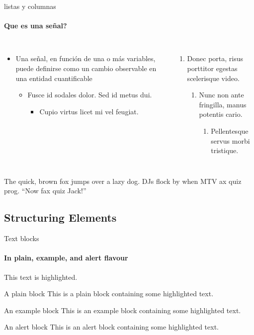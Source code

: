 \begin{darkframes}
    \begin{frame}[label=lists]{listas y columnas}
      \framesubtitle{Que es una señal?}
      \begin{columns}[onlytextwidth]
          \begin{itemize}
            \item {Una señal, en función de una o más variables, puede definirse como un cambio observable en una entidad cuantificable}
            \begin{itemize}
              \item Fusce id sodales dolor. Sed id metus dui.
              \begin{itemize}
                \item Cupio virtus licet mi vel feugiat.
              \end{itemize}
            \end{itemize}
          \end{itemize}
          \begin{enumerate}
            \item Donec porta, risus porttitor egestas scelerisque video.
            \begin{enumerate}
              \item Nunc non ante fringilla, manus potentis cario.
              \begin{enumerate}
                \item Pellentesque servus morbi tristique.
              \end{enumerate}
            \end{enumerate}
          \end{enumerate}
      \end{columns}
      \bigskip
      \justifying

      {The quick, brown fox jumps over a lazy
      dog. DJs flock by when MTV ax quiz prog. “Now fax quiz Jack!”}
    \end{frame}

    \subsection{Structuring Elements}
    \begin{frame}[label=simmonshall]{Text blocks}
      \framesubtitle{In plain, example, and \alert{alert} flavour}
      \alert{This text} is highlighted.

      \begin{block}{A plain block}
        This is a plain block containing some \alert{highlighted text}.
      \end{block}
      \begin{exampleblock}{An example block}
        This is an example block containing some \alert{highlighted text}.
      \end{exampleblock}
      \begin{alertblock}{An alert block}
        This is an alert block containing some \alert{highlighted text}.
      \end{alertblock}
    \end{frame}


\end{darkframes}
